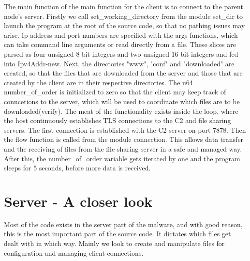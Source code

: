 \documentclass[../main.tex]{subfiles}
\begin{document}
The main function of the main function for the client is to connect to the parent node's server.
Firstly we call set\_working\_directory from the module set\_dir to launch the program at the root of the source code, so that no pathing issues may arise.
Ip address and port numbers are specified with the args functions, which can take command line arguments or read directly from a file. These slices are parsed as four unsigned 8 bit
integers and two unsigned 16 bit integers and fed into Ipv4Addr-new. Next, the directories "www", "conf" and "downloaded" are created, so that the files that are downloaded from 
the server and those that are created by the client are in their respective directories. The u64 number\_of\_order is initialized to zero so that the client may keep track of conncetions
to the server, which will be used to coordinate which files are to be downloaded(verify). The meat of the functionality exists inside the loop, where the host continuously
establishes TLS connections to the C2 and file sharing servers. The first connection is established with the C2 server on port 7878. Then the flow function is 
called from the module connection. This allows data transfer and the receiving of files from the file sharing server in a safe and managed way. After this, the number\_of\_order variable
gets iterated by one and the program sleeps for 5 seconds, before more data is received.
	\vspace{10pt}

	\section{Server -  A closer look}


Most of the code exists in the server part of the malware, and with good reason, this is the most important part of the source code. It dictates which files get dealt with in which way.
Mainly we look to create and manipulate files for configuration and managing client connections.
\end{document}
